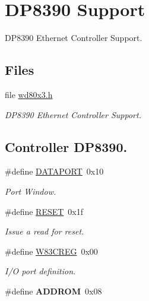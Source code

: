 \hypertarget{group__gumstix__dp8390}{}\section{D\+P8390 Support}
\label{group__gumstix__dp8390}


D\+P8390 Ethernet Controller Support.  


\subsection*{Files}
\begin{DoxyCompactItemize}
\item 
file \mbox{\hyperlink{arm_2gumstix_2net_2wd80x3_8h}{wd80x3.\+h}}
\begin{DoxyCompactList}\small\item\em D\+P8390 Ethernet Controller Support. \end{DoxyCompactList}\end{DoxyCompactItemize}
\subsection*{Controller D\+P8390.}
\begin{DoxyCompactItemize}
\item 
\mbox{\label{group__gumstix__dp8390_gac16acb45473784cda1010a2c24cac543}} 
\#define \mbox{\hyperlink{group__gumstix__dp8390_gac16acb45473784cda1010a2c24cac543}{D\+A\+T\+A\+P\+O\+RT}}~0x10
\begin{DoxyCompactList}\small\item\em Port Window. \end{DoxyCompactList}\item 
\mbox{\label{group__gumstix__dp8390_gab702106cf3b3e96750b6845ded4e0299}} 
\#define \mbox{\hyperlink{group__gumstix__dp8390_gab702106cf3b3e96750b6845ded4e0299}{R\+E\+S\+ET}}~0x1f
\begin{DoxyCompactList}\small\item\em Issue a read for reset. \end{DoxyCompactList}\item 
\mbox{\label{group__gumstix__dp8390_ga11d5a6d241e96045fb3c36cfe5445df2}} 
\#define \mbox{\hyperlink{group__gumstix__dp8390_ga11d5a6d241e96045fb3c36cfe5445df2}{W83\+C\+R\+EG}}~0x00
\begin{DoxyCompactList}\small\item\em I/O port definition. \end{DoxyCompactList}\item 
\mbox{\label{group__gumstix__dp8390_gafd3ee92f8fab9884fb8a9d93f60453cf}} 
\#define {\bfseries A\+D\+D\+R\+OM}~0x08
\end{DoxyCompactItemize}
